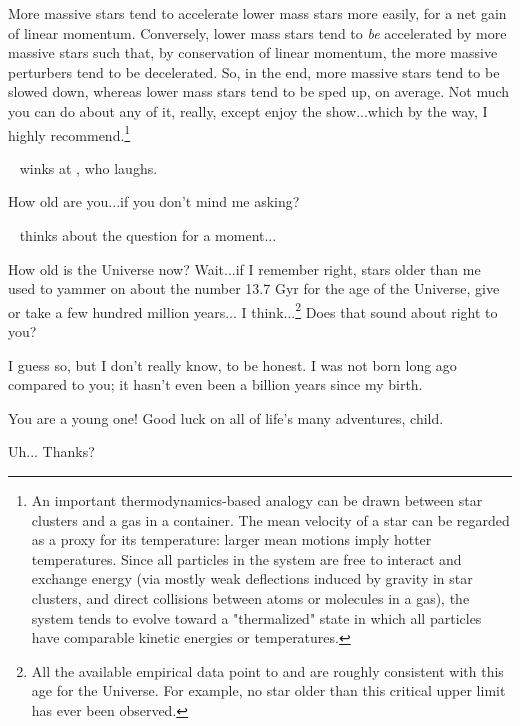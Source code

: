 \documentclass[main.tex]{subfiles}
\begin{document}
\par \Enrico More massive stars tend to accelerate lower mass stars more easily, for a net gain of linear momentum.  Conversely, lower mass stars tend to \textit{be} accelerated by more massive stars such that, by conservation of linear momentum, the more massive perturbers tend to be decelerated. So, in the end, more massive stars tend to be slowed down, whereas lower mass stars tend to be sped up, on average.  Not much you can do about any of it, really, except enjoy the show...which by the way, I highly recommend.\footnote{An important thermodynamics-based analogy can be drawn between star clusters and a gas in a container.  The mean velocity of a star can be regarded as a proxy for its temperature:  larger mean motions imply hotter temperatures.  Since all particles in the system are free to interact and exchange energy (via mostly weak deflections induced by gravity in star clusters, and direct collisions between atoms or molecules in a gas), the system tends to evolve toward a "thermalized" state in which all particles have comparable kinetic energies or temperatures.}

\par \nar \rmenrico~ winks at \rmsterope, who laughs.

\par \Sterope How old are you...if you don't mind me asking?

\par \nar \rmenrico~ thinks about the question for a moment...

\par \Enrico How old is the Universe now?  Wait...if I remember right, stars older than me used to yammer on about the number 13.7 Gyr for the age of the Universe, give or take a few hundred million years... I think...\footnote{All the available empirical data point to and are roughly consistent with this age for the Universe.  For example, no star older than this critical upper limit has ever been observed.}  Does that sound about right to you?

\par \Sterope I guess so, but I don't really know, to be honest.  I was not born long ago compared to you; it hasn't even been a billion years since my birth.

\par \Enrico You are a young one!  Good luck on all of life's many adventures, child.  

\par \Sterope Uh... Thanks?
\end{document}
